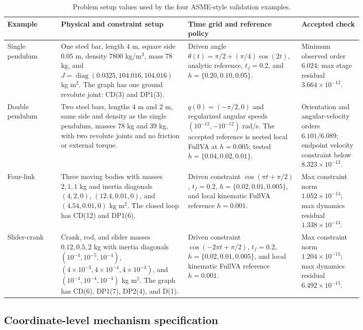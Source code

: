 \documentclass[preprint,12pt]{elsarticle}
\begin{document}
\begin{table}[htbp]
\centering
\scriptsize
\setlength{\tabcolsep}{3pt}
\caption{Problem setup values used by the four ASME-style validation examples.}
\label{tab:asme-setup}
\begin{tabular}{P{0.14\linewidth}P{0.30\linewidth}P{0.24\linewidth}P{0.16\linewidth}}
\toprule
Example & Physical and constraint setup & Time grid and reference policy & Accepted check \\
\midrule
Single pendulum &
One steel bar, length $4$ m, square side $0.05$ m, density
$7800$ kg/m$^3$, mass $78$ kg, and
$J=\operatorname{diag}(0.0325,104.016,104.016)$ kg m$^2$.
The graph has one ground revolute joint: CD(3) and DP1(3). &
Driven angle
$\theta(t)=\pi/2+(\pi/4)\cos(2t)$, analytic reference,
$t_f=0.2$, and $h=\{0.20,0.10,0.05\}$. &
Minimum observed order $6.024$; max stage residual
$3.664\times10^{-12}$. \\
Double pendulum &
Two steel bars, lengths $4$ m and $2$ m, same side and density as the
single pendulum, masses $78$ kg and $39$ kg, with two revolute joints and no
friction or external torque. &
$q(0)=(-\pi/2,0)$ and regularized angular speeds
$(10^{-12},-10^{-12})$ rad/s. The accepted reference is nested local
FullVA at $h=0.005$; tested $h=\{0.04,0.02,0.01\}$. &
Orientation and angular-velocity orders $6.101/6.089$; endpoint velocity
constraint below $8.323\times10^{-12}$. \\
Four-link &
Three moving bodies with masses $2,1,1$ kg and inertia diagonals
$(4,2,0)$, $(12.4,0.01,0)$, and $(4.54,0.01,0)$ kg m$^2$.
The closed loop has CD(12) and DP1(6). &
Driven constraint $\cos(\pi t+\pi/2)$, $t_f=0.2$,
$h=\{0.02,0.01,0.005\}$, and local kinematic FullVA reference
$h=0.001$. &
Max constraint norm $1.052\times10^{-14}$; max dynamics residual
$1.338\times10^{-13}$. \\
Slider-crank &
Crank, rod, and slider masses $0.12,0.5,2$ kg with inertia diagonals
$(10^{-4},10^{-5},10^{-4})$, $(4\times10^{-3},4\times10^{-4},
4\times10^{-3})$, and $(10^{-4},10^{-4},10^{-4})$ kg m$^2$.
The graph has CD(6), DP1(7), DP2(4), and D(1). &
Driven constraint $\cos(-2\pi t+\pi/2)$, $t_f=0.2$,
$h=\{0.02,0.01,0.005\}$, and local kinematic FullVA reference
$h=0.001$. &
Max constraint norm $1.204\times10^{-15}$; max dynamics residual
$6.492\times10^{-15}$. \\
\bottomrule
\end{tabular}
\end{table}

\subsection{Coordinate-level mechanism specification}
\end{document}
